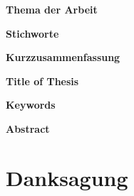 %
%
\newpage
\thispagestyle{plain}
\clearpage
\hfuzz=12pt       %

\textbf{\IthesisAuthor}

\vspace{0.3cm}
\textbf{Thema der Arbeit}

\IthesisTitle

\vspace{0.3cm}
\textbf{Stichworte}

\IkeyWordsDE

\vspace{0.3cm}
\textbf{Kurzzusammenfassung}

\begin{minipage}{\textwidth}
\IabstractDE
\end{minipage}

\clearpage
\textbf{\IthesisAuthor}

\vspace{0.3cm}
\textbf{Title of Thesis}

\IthesisTitleEN

\vspace{0.3cm}
\textbf{Keywords}

\begin{minipage}{\textwidth}
\IkeyWordsEN
\end{minipage}

\vspace{0.3cm}
\textbf{Abstract}

\IabstractEN

\newpage
\thispagestyle{plain}
\clearpage
\hfuzz=12pt       %

\chapter*{Danksagung}

